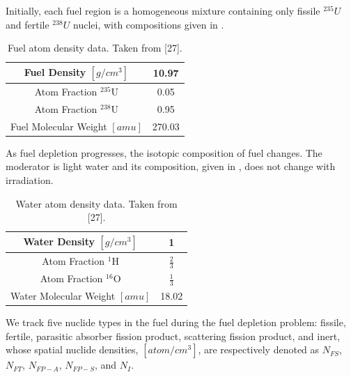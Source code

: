 Initially, each fuel region is a homogeneous mixture containing only fissile $^{235}U$ and fertile $^{238}U$ nuclei, with compositions given in .
\begin{table}[!htp]
\centering
\caption{Fuel atom density data.  Taken from [27].}
\begin{tabular}{|c|c|}
\hline
Fuel Density $[g/cm^3]$  & 10.97 \\
\hline
Atom Fraction $^{235}\text{U}$	& 0.05 \\
\hline
Atom Fraction $^{238}\text{U}$ & 0.95 \\
\hline
Fuel Molecular Weight $[amu]$ & 270.03\\
\hline
\end{tabular}
\label{tbl:fuel_atom_density}
\end{table}
%
As fuel depletion progresses, the isotopic composition of fuel changes.
The moderator is light water and its composition, given in , does not change with irradiation.
\begin{table}[!htp]
\centering
\caption{Water atom density data.  Taken from [27].}
\begin{tabular}{|c|c|}
\hline
Water Density $[g/cm^3]$  & 1 \\
\hline
Atom Fraction $^1\text{H}$	& $\frac{2}{3}$ \\
\hline
Atom Fraction $^{16}\text{O}$ & $\frac{1}{3}$ \\
\hline
Water Molecular Weight $[amu]$ & 18.02\\
\hline
\end{tabular}
\label{tbl:water_atom_density}
\end{table}
We track five nuclide types in the fuel during the fuel depletion problem: fissile, fertile, parasitic absorber fission product, scattering fission product, and inert, whose spatial nuclide densities, $[atom/cm^{3}]$, are respectively denoted as $N_{FS}$, $N_{FT}$, $N_{FP-A}$, $N_{FP-S}$, and $N_I$.

